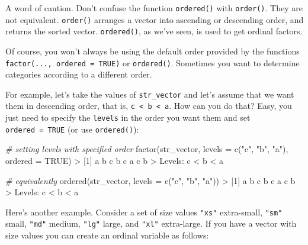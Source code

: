 \documentclass[
]{book}
\newenvironment{Shaded}{\begin{snugshade}}{\end{snugshade}}
\newcommand{\AttributeTok}[1]{\textcolor[rgb]{0.77,0.63,0.00}{#1}}
\newcommand{\CommentTok}[1]{\textcolor[rgb]{0.56,0.35,0.01}{\textit{#1}}}
\newcommand{\ConstantTok}[1]{\textcolor[rgb]{0.00,0.00,0.00}{#1}}
\newcommand{\DecValTok}[1]{\textcolor[rgb]{0.00,0.00,0.81}{#1}}
\newcommand{\FunctionTok}[1]{\textcolor[rgb]{0.00,0.00,0.00}{#1}}
\newcommand{\NormalTok}[1]{#1}
\newcommand{\SpecialCharTok}[1]{\textcolor[rgb]{0.00,0.00,0.00}{#1}}
\newcommand{\StringTok}[1]{\textcolor[rgb]{0.31,0.60,0.02}{#1}}
\begin{document}
A word of caution. Don't confuse the function \texttt{ordered()} with \texttt{order()}. They
are not equivalent. \texttt{order()} arranges a vector into ascending or descending
order, and returns the sorted vector. \texttt{ordered()}, as we've seen, is used to
get ordinal factors.

Of course, you won't always be using the default order provided by the
functions \texttt{factor(...,\ ordered\ =\ TRUE)} or \texttt{ordered()}. Sometimes you want to
determine categories according to a different order.

For example, let's take the values of \texttt{str\_vector} and let's assume that we
want them in descending order, that is, \texttt{c\ \textless{}\ b\ \textless{}\ a}. How can you do that? Easy,
you just need to specify the \texttt{levels} in the order you want them and set
\texttt{ordered\ =\ TRUE} (or use \texttt{ordered()}):

\begin{Shaded}
\begin{Highlighting}[]
\CommentTok{\# setting levels with specified order}
\FunctionTok{factor}\NormalTok{(str\_vector, }\AttributeTok{levels =} \FunctionTok{c}\NormalTok{(}\StringTok{"c"}\NormalTok{, }\StringTok{"b"}\NormalTok{, }\StringTok{"a"}\NormalTok{), }\AttributeTok{ordered =} \ConstantTok{TRUE}\NormalTok{)}
\SpecialCharTok{\textgreater{}}\NormalTok{ [}\DecValTok{1}\NormalTok{] a b c b c a c b}
\SpecialCharTok{\textgreater{}}\NormalTok{ Levels}\SpecialCharTok{:}\NormalTok{ c }\SpecialCharTok{\textless{}}\NormalTok{ b }\SpecialCharTok{\textless{}}\NormalTok{ a}

\CommentTok{\# equivalently}
\FunctionTok{ordered}\NormalTok{(str\_vector, }\AttributeTok{levels =} \FunctionTok{c}\NormalTok{(}\StringTok{"c"}\NormalTok{, }\StringTok{"b"}\NormalTok{, }\StringTok{"a"}\NormalTok{))}
\SpecialCharTok{\textgreater{}}\NormalTok{ [}\DecValTok{1}\NormalTok{] a b c b c a c b}
\SpecialCharTok{\textgreater{}}\NormalTok{ Levels}\SpecialCharTok{:}\NormalTok{ c }\SpecialCharTok{\textless{}}\NormalTok{ b }\SpecialCharTok{\textless{}}\NormalTok{ a}
\end{Highlighting}
\end{Shaded}

Here's another example. Consider a set of size values \texttt{"xs"} extra-small, \texttt{"sm"}
small, \texttt{"md"} medium, \texttt{"lg"} large, and \texttt{"xl"} extra-large. If you have a
vector with size values you can create an ordinal variable as follows:
\end{document}
